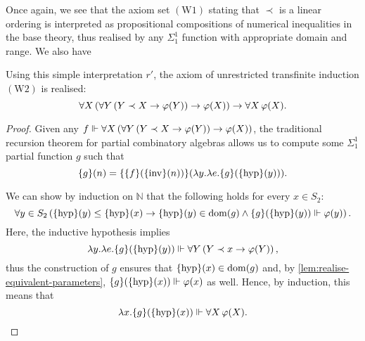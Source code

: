 \documentclass[11pt]{article}
\theoremstyle{plain}
\theoremstyle{definition}
\DeclareMathOperator{\dom}{dom}
\begin{document}
Once again, we see that the axiom set $\left(\mathrm{W}1\right)$ stating that $\prec$ is a linear ordering is interpreted as propositional compositions of numerical inequalities in the base theory, thus realised by any $\Sigma^1_1$ function with appropriate domain and range. We also have

\begin{proposition}
    Using this simple interpretation $r'$, the axiom of unrestricted transfinite induction $\left(\mathrm{W}2\right)$ is realised:
    \[\forall X \left(\forall Y \left(Y \prec X \rightarrow \varphi\mleft(Y\mright)\right) \rightarrow \varphi\mleft(X\mright)\right) \rightarrow \forall X \, \varphi\mleft(X\mright).\]
\end{proposition}

\begin{proof}
    Given any $f \Vdash \forall X \left(\forall Y \left(Y \prec X \rightarrow \varphi\mleft(Y\mright)\right) \rightarrow \varphi\mleft(X\mright)\right)$, the traditional recursion theorem for partial combinatory algebras allows us to compute some $\Sigma^1_1$ partial function $g$ such that
    \[\mleft\{g\mright\}\mleft(n\mright) = \mleft\{\mleft\{f\mright\}\mleft(\mleft\{\mathrm{inv}\mright\}\mleft(n\mright)\mright)\mright\}\mleft(\lambda y. \lambda e. \mleft\{g\mright\}\mleft(\mleft\{\mathrm{hyp}\mright\}\mleft(y\mright)\mright)\mright).\]

    We can show by induction on $\mathbb{N}$ that the following holds for every $x \in S_2$:
    \[\forall y \in S_2 \left(\mleft\{\mathrm{hyp}\mright\}\mleft(y\mright) \leq \mleft\{\mathrm{hyp}\mright\}\mleft(x\mright) \rightarrow \mleft\{\mathrm{hyp}\mright\}\mleft(y\mright) \in \dom\mleft(g\mright) \land \mleft\{g\mright\}\mleft(\mleft\{\mathrm{hyp}\mright\}\mleft(y\mright)\mright) \Vdash \varphi\mleft(y\mright)\right).\]
    Here, the inductive hypothesis implies
    \[\lambda y. \lambda e. \mleft\{g\mright\}\mleft(\mleft\{\mathrm{hyp}\mright\}\mleft(y\mright)\mright) \Vdash \forall Y \left(Y \prec x \rightarrow \varphi\mleft(Y\mright)\right),\]
    thus the construction of $g$ ensures that $\mleft\{\mathrm{hyp}\mright\}\mleft(x\mright) \in \dom\mleft(g\mright)$ and, by \autoref{lem:realise-equivalent-parameters}, $\mleft\{g\mright\}\mleft(\mleft\{\mathrm{hyp}\mright\}\mleft(x\mright)\mright) \Vdash \varphi\mleft(x\mright)$ as well. Hence, by induction, this means that
    \[\lambda x. \mleft\{g\mright\}\mleft(\mleft\{\mathrm{hyp}\mright\}\mleft(x\mright)\mright) \Vdash \forall X \, \varphi\mleft(X\mright). \qedhere\]
\end{proof}
\end{document}
